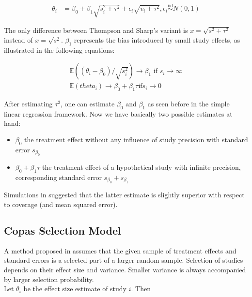 \documentclass[11pt,a4paper,twoside]{book}\usepackage[]{graphicx}\usepackage[]{color}
\begin{document}
\begin{align}
\theta_i & = \beta_0 + \beta_1\sqrt{s_i^2 + \tau^2} + \epsilon_i\sqrt{v_i + \tau^2}, \epsilon_i \stackrel{\textrm{iid}}{\sim} N(0,1)  \label{eq:limitmeta.regression}
\end{align}

The only difference between Thompson and Sharp's variant is $x = \sqrt{s^2 + \tau^2}$ instead of $x = \sqrt{s^2}$. $\beta_{1}$ represents the bias introduced by small study effects, as illustrated in the following equations:

\begin{align}
\mathbb{E}((\theta_i - \beta_0)/\sqrt{s_i^2}) \rightarrow \beta_1 \textrm{ if } s_i \rightarrow \infty \nonumber \\ %
\mathbb{E}(theta_i) \rightarrow \beta_0 + \beta_1 \tau \textrm{if} s_i \rightarrow 0 \nonumber
\end{align}

After estimating $\tau^2$, one can estimate $\beta_{0}$ and $\beta_{1}$ as seen before in the simple linear regression framework. Now we have basically two possible estimates at hand:
\begin{itemize}
\item $\beta_0$ the treatment effect without any influence of study precision with standard error $s_{\beta_0}$
\item $\beta_0 + \beta_1 \tau$ the treatment effect of a hypothetical study with infinite precision, corresponding standard error $s_{\beta_0} + s_{\beta_1}$
\end{itemize}

Simulations in \citet{limitmeta} suggested that the latter estimate is slightly superior with respect to coverage (and mean squared error).



\subsection{Copas Selection Model}

A method proposed in \cite{Copas1,Copas2,Copas3} 
assumes that the given sample of treatment effects and standard errors is a selected part of a larger random sample. Selection of studies depends on their effect size and variance. Smaller variance is always accompanied by larger selection probability. \\
Let $\theta_i$ be the effect size estimate of study $i$. Then 
\end{document}
